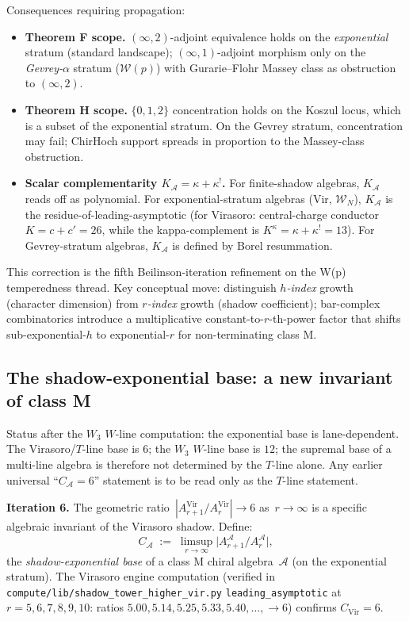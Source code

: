 \documentclass[11pt]{article}
\newcommand{\cA}{\mathcal{A}}
\newcommand{\cW}{\mathcal{W}}
\begin{document}
Consequences requiring propagation:
\begin{itemize}
  \item \textbf{Theorem F scope.} $(\infty, 2)$-adjoint equivalence
        holds on the \emph{exponential} stratum (standard landscape);
        $(\infty, 1)$-adjoint morphism only on the
        \emph{Gevrey-$\alpha$} stratum ($\cW(p)$) with
        Gurarie--Flohr Massey class as obstruction to $(\infty, 2)$.
  \item \textbf{Theorem H scope.} $\{0, 1, 2\}$ concentration holds
        on the Koszul locus, which is a subset of the exponential
        stratum. On the Gevrey stratum, concentration may fail;
        ChirHoch support spreads in proportion to the Massey-class
        obstruction.
  \item \textbf{Scalar complementarity $K_\cA = \kappa + \kappa^!$.}
        For finite-shadow algebras, $K_\cA$ reads off as polynomial.
        For exponential-stratum algebras (Vir, $\cW_N$), $K_\cA$
        is the residue-of-leading-asymptotic
        (for Virasoro: central-charge conductor $K=c+c'=26$,
        while the kappa-complement is
        $K^\kappa=\kappa+\kappa^!=13$). For Gevrey-stratum algebras, $K_\cA$ is defined
        by Borel resummation.
\end{itemize}

This correction is the fifth Beilinson-iteration refinement on
the W(p) temperedness thread. Key conceptual move: distinguish
\emph{$h$-index} growth (character dimension) from \emph{$r$-index}
growth (shadow coefficient); bar-complex combinatorics introduce
a multiplicative constant-to-$r$-th-power factor that shifts
sub-exponential-$h$ to exponential-$r$ for non-terminating class M.

\subsection{The shadow-exponential base: a new invariant of class M}
\label{subsec:shadow-exponential-base-2026-04-17}

\noindent
Status after the $W_3$ $W$-line computation: the exponential base
is lane-dependent.  The Virasoro/$T$-line base is $6$; the
$W_3$ $W$-line base is $12$; the supremal base of a multi-line
algebra is therefore not determined by the $T$-line alone.  Any
earlier universal ``$C_{\cA}=6$'' statement is to be read only as
the $T$-line statement.

\textbf{Iteration 6.} The geometric ratio~$|A_{r+1}^{\mathrm{Vir}}/
A_r^{\mathrm{Vir}}| \to 6$ as~$r\to\infty$ is a specific algebraic
invariant of the Virasoro shadow. Define:
\[
  C_{\cA} \;:=\; \limsup_{r\to\infty}
  \bigl|A_{r+1}^{\cA}/A_r^{\cA}\bigr|,
\]
the \emph{shadow-exponential base} of a class M chiral algebra~$\cA$
(on the exponential stratum). The Virasoro engine computation
(verified in \verb|compute/lib/shadow_tower_higher_vir.py|
\verb|leading_asymptotic| at $r=5,6,7,8,9,10$: ratios
$5.00, 5.14, 5.25, 5.33, 5.40, \ldots, \to 6$) confirms
$C_{\mathrm{Vir}} = 6$.
\end{document}
